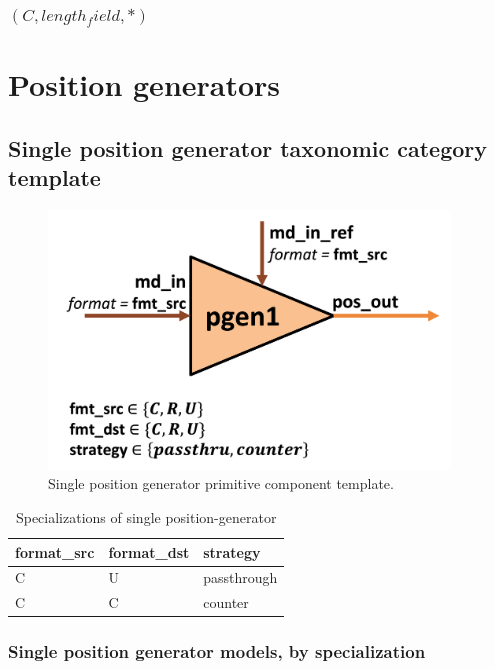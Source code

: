 \subsubsection{$(C,length_field,*)$}

\section{Position generators}

\subsection{Single position generator taxonomic category template}

\begin{figure}[H]
    \centering
    \includegraphics[width=0.95\textwidth]{figures/pgen1.png}
    \caption{Single position generator primitive component template.}
    \label{fig:pgen1}
\end{figure}

\begin{table}[H]
\centering
\begin{tabular}{lll}
\toprule
 format\_src   & format\_dst   & strategy    \\
\midrule
 C            & U            & passthrough \\
 C            & C            & counter     \\
\bottomrule
\end{tabular}
\caption{Specializations of single position-generator}
\label{tab:SinglePositionGenerator_specializations}
\end{table}

\subsubsection{Single position generator models, by specialization}

